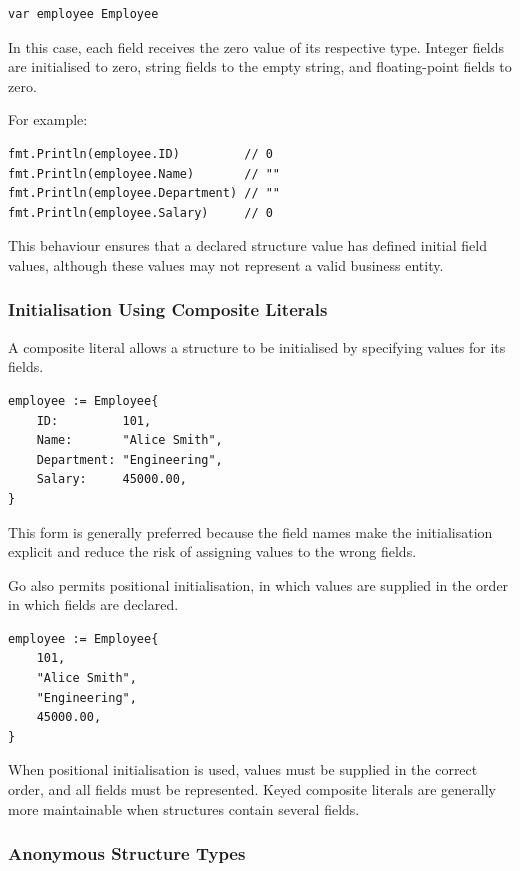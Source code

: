\begin{lstlisting}
var employee Employee
\end{lstlisting}

In this case, each field receives the zero value of its respective type. Integer fields are initialised to zero, string fields to the empty string, and floating-point fields to zero.

For example:

\begin{lstlisting}
fmt.Println(employee.ID)         // 0
fmt.Println(employee.Name)       // ""
fmt.Println(employee.Department) // ""
fmt.Println(employee.Salary)     // 0
\end{lstlisting}

This behaviour ensures that a declared structure value has defined initial field values, although these values may not represent a valid business entity.

\subsubsection{Initialisation Using Composite Literals}

A composite literal allows a structure to be initialised by specifying values for its fields.

\begin{lstlisting}
employee := Employee{
    ID:         101,
    Name:       "Alice Smith",
    Department: "Engineering",
    Salary:     45000.00,
}
\end{lstlisting}

This form is generally preferred because the field names make the initialisation explicit and reduce the risk of assigning values to the wrong fields.

Go also permits positional initialisation, in which values are supplied in the order in which fields are declared.

\begin{lstlisting}
employee := Employee{
    101,
    "Alice Smith",
    "Engineering",
    45000.00,
}
\end{lstlisting}

When positional initialisation is used, values must be supplied in the correct order, and all fields must be represented. Keyed composite literals are generally more maintainable when structures contain several fields.

\subsubsection{Anonymous Structure Types}

